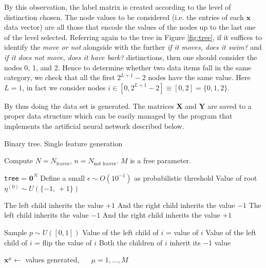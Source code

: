 \documentclass[a4paper,12pt]{article}
\begin{document}
By this observation, the label matrix is created according to the level of distinction chosen. The node values to be considered (i.e. the entries of each $\bm{x}$ data vector) are all those that encode the values of the nodes up to the last one of the level selected. Referring again to the tree in Figure \ref{fig:tree}, if it suffices to identify the \textit{move or not} alongside with the further \textit{if it moves, does it swim?} and \textit{if it does not move, does it have bark?} distinctions, then one should consider the nodes 0, 1, and 2. Hence to determine whether two data items fall in the same category, we check that all the first $2^{L+1}-2$ nodes have the same value. Here $L = 1$, in fact we consider nodes $i \in [0, 2^{L+1}-2] \equiv [0, 2] = \{0,1,2\}$.

By thus doing the data set is generated. The matrices $\bm{X}$ and $\bm{Y}$ are saved to a proper data structure which can be easily managed by the program that implements the artificial neural network described below.


\begin{algorithm}
	\begin{algorithmic}[1]
		\caption{Binary tree. Single feature generation}
		
		\State Compute $N = N_{\text{leaves}}$, $n = N_{\text{not leaves}}$. $M$ is a free parameter.
		
		\State \texttt{tree} = $\bm{0}^{N}$
		\State Define a small $\epsilon \sim O(10^{-1})$ as probabilistic threshold
		\State Value of root $\eta^{(0)} \sim U(\{-1, \, +1\})$
		
			\vspace{1mm}
			\State The left child inherits the value $+1$
			\State And the right child inherits the value $-1$
		\Else 
			\vspace{1mm}
			\State The left child inherits the value $-1$
			\State And the right child inherits the value $+1$
		\EndIf
		
		\vspace{1mm}
		
			\vspace{2mm}
				Sample $p \sim U([0,1])$
					\State Value of the left child of $i$ = value of $i$
				\Else 
					\State Value of the left child of $i$ = flip the value of $i$
				\EndIf
			\Else
				\State Both the children of $i$ inherit its $-1$ value
			\EndIf
		\EndFor
		
		\State $\bm{x}^{\mu} \leftarrow $ values generated, $\quad$ $\mu = 1 , \dots, M$
		
		\label{alg:singleFeature}
	\end{algorithmic}
\end{algorithm}
\end{document}
